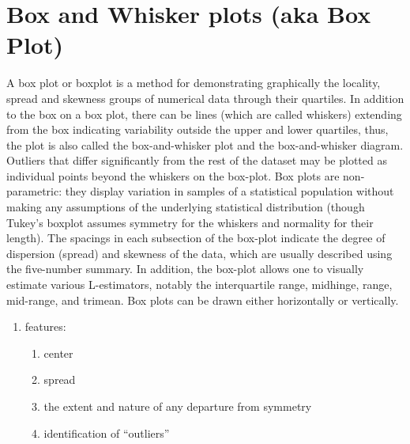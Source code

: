 \section{Box and Whisker plots (aka Box Plot)}\label{Box and Whisker plots (aka Box Plot)}
A box plot or boxplot is a method for demonstrating graphically the locality, spread and skewness groups of numerical data through their quartiles. In addition to the box on a box plot, there can be lines (which are called whiskers) extending from the box indicating variability outside the upper and lower quartiles, thus, the plot is also called the box-and-whisker plot and the box-and-whisker diagram. Outliers that differ significantly from the rest of the dataset may be plotted as individual points beyond the whiskers on the box-plot. Box plots are non-parametric: they display variation in samples of a statistical population without making any assumptions of the underlying statistical distribution (though Tukey's boxplot assumes symmetry for the whiskers and normality for their length). The spacings in each subsection of the box-plot indicate the degree of dispersion (spread) and skewness of the data, which are usually described using the five-number summary. In addition, the box-plot allows one to visually estimate various L-estimators, notably the interquartile range, midhinge, range, mid-range, and trimean. Box plots can be drawn either horizontally or vertically.

\begin{enumerate}
    \item features:
    \begin{enumerate}
        \item center
        \item spread
        \item the extent and nature of any departure from symmetry
        \item identification of “outliers”
    \end{enumerate}
\end{enumerate}

